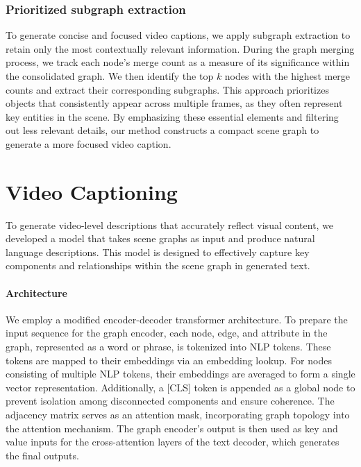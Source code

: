 \subsubsection{Prioritized subgraph extraction}
To generate concise and focused video captions, we apply subgraph extraction to retain only the most contextually relevant information. 
During the graph merging process, we track each node's merge count as a measure of its significance within the consolidated graph. 
We then identify the top $k$ nodes with the highest merge counts and extract their corresponding subgraphs. 
This approach prioritizes objects that consistently appear across multiple frames, as they often represent key entities in the scene. 
By emphasizing these essential elements and filtering out less relevant details, our method constructs a compact scene graph to generate a more focused video caption.

\section{Video Captioning}
\label{sec:videocaption}
To generate video-level descriptions that accurately reflect visual content, we developed a model that takes scene graphs as input and produce natural language descriptions.
This model is designed to effectively capture key components and relationships within the scene graph in generated text.

\vspace{-2mm}
\paragraph{Architecture}
We employ a modified encoder-decoder transformer architecture.
To prepare the input sequence for the graph encoder, each node, edge, and attribute in the graph, represented as a word or phrase, is tokenized into NLP tokens. 
These tokens are mapped to their embeddings via an embedding lookup.
For nodes consisting of multiple NLP tokens, their embeddings are averaged to form a single vector representation.
Additionally, a [CLS] token is appended as a global node to prevent isolation among disconnected components and ensure coherence. 
The adjacency matrix serves as an attention mask, incorporating graph topology into the attention mechanism. 
The graph encoder's output is then used as key and value inputs for the cross-attention layers of the text decoder, which generates the final outputs.

\vspace{-2mm}
